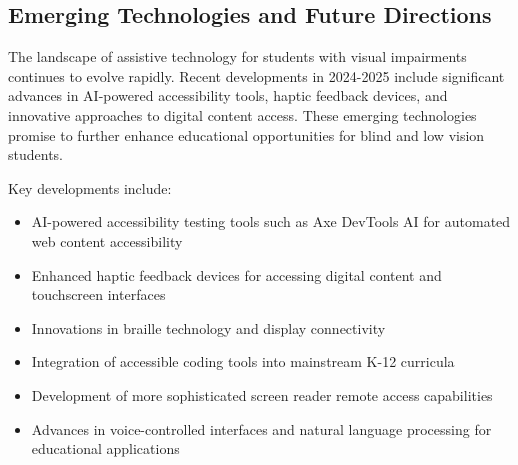 \begin{itemize}
\begin{itemize}
\begin{itemize}
\section{Emerging Technologies and Future Directions}\label{appx12}

The landscape of assistive technology for students with visual impairments continues to evolve rapidly. Recent developments in 2024-2025 include significant advances in AI-powered accessibility tools, haptic feedback devices, and innovative approaches to digital content access. These emerging technologies promise to further enhance educational opportunities for blind and low vision students.

Key developments include:
\begin{itemize}
 \begin{itemize}
  \item AI-powered accessibility testing tools such as Axe DevTools AI for automated web content accessibility
  \item Enhanced haptic feedback devices for accessing digital content and touchscreen interfaces
  \item Innovations in braille technology and display connectivity
  \item Integration of accessible coding tools into mainstream K-12 curricula
  \item Development of more sophisticated screen reader remote access capabilities
  \item Advances in voice-controlled interfaces and natural language processing for educational applications
 \end{itemize}


\end{itemize}
\end{itemize}
\end{itemize}
\end{itemize}
